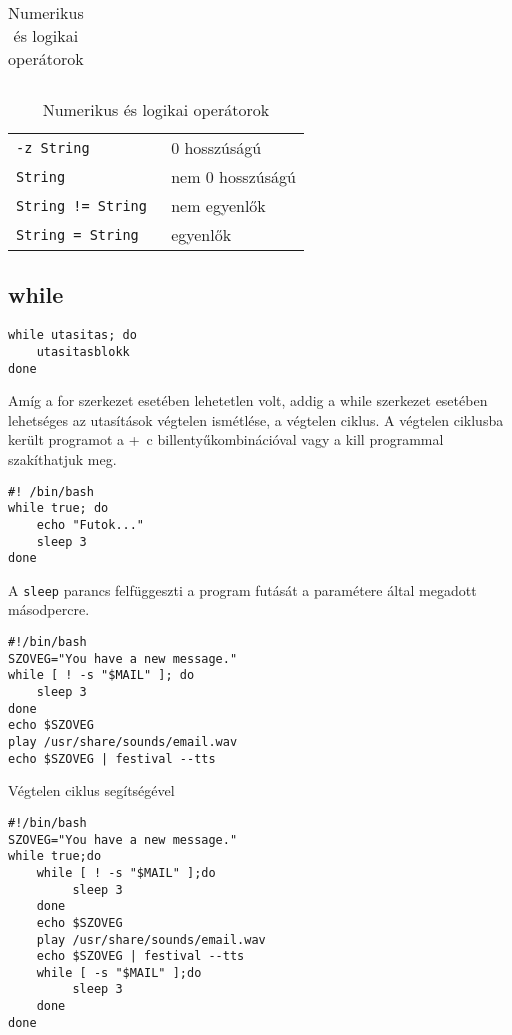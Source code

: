 \begin{table}[!h]
\begin{tabular}{|ll|}
\hline
  \end{tabular}
\caption{Numerikus és logikai operátorok}
\medskip
\centering
 \begin{tabular}{|ll|}
          \hline
\tt -z String		& 0 hosszúságú
\\
\tt String			& nem 0 hosszúságú
\\
\tt String != String	& nem egyenlők
\\
\tt String = String		& egyenlők
\\
\hline
  \end{tabular}
\caption{Numerikus és logikai operátorok}
\end{table}

\vfill\pagebreak

\subsection{while}

\begin{lstlisting}
while utasitas; do
    utasitasblokk
done
\end{lstlisting}

Amíg a for szerkezet esetében lehetetlen volt, addig a while szerkezet esetében lehetséges az
utasítások végtelen ismétlése, a végtelen ciklus. A végtelen ciklusba került programot a
\Ctrl+\ c billentyűkombinációval vagy a kill programmal szakíthatjuk meg.\bigskip


\begin{lstlisting}
#! /bin/bash
while true; do
    echo "Futok..."
    sleep 3
done
\end{lstlisting}
A \texttt{sleep} parancs felfüggeszti a program futását a paramétere által megadott másodpercre.



\begin{lstlisting}
#!/bin/bash
SZOVEG="You have a new message."
while [ ! -s "$MAIL" ]; do
    sleep 3
done
echo $SZOVEG
play /usr/share/sounds/email.wav
echo $SZOVEG | festival --tts
\end{lstlisting}

Végtelen ciklus segítségével
\begin{lstlisting}
#!/bin/bash
SZOVEG="You have a new message."
while true;do
    while [ ! -s "$MAIL" ];do
         sleep 3
    done
    echo $SZOVEG
    play /usr/share/sounds/email.wav
    echo $SZOVEG | festival --tts
    while [ -s "$MAIL" ];do
         sleep 3
    done
done
\end{lstlisting}


